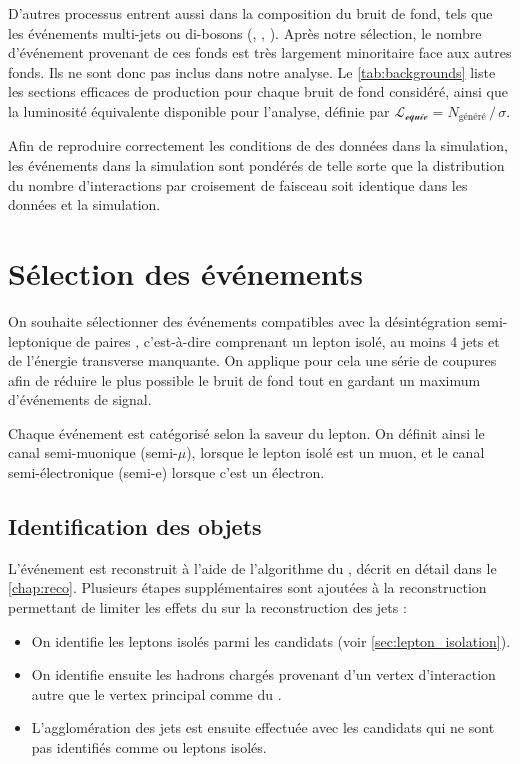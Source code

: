 D'autres processus entrent aussi dans la composition du bruit de fond, tels que les événements multi-jets ou di-bosons (\PW{}\PW, \PZ{}\PZ, \PW{}\PZ). Après notre sélection, le nombre d'événement provenant de ces fonds est très largement minoritaire face aux autres fonds. Ils ne sont donc pas inclus dans notre analyse. Le \cref{tab:backgrounds} liste les sections efficaces de production pour chaque bruit de fond considéré, ainsi que la luminosité équivalente disponible pour l'analyse, définie par $\mathcal{L_\text{equiv}} = N_\text{généré} \, / \, \sigma$.

Afin de reproduire correctement les conditions de \pu des données dans la simulation, les événements dans la simulation sont pondérés de telle sorte que la distribution du nombre d'interactions par croisement de faisceau soit identique dans les données et la simulation.

\section{Sélection des événements}

On souhaite sélectionner des événements compatibles avec la désintégration semi-leptonique de paires \ttbar, c'est-à-dire comprenant un lepton isolé, au moins 4 jets et de l'énergie transverse manquante. On applique pour cela une série de coupures afin de réduire le plus possible le bruit de fond tout en gardant un maximum d'événements de signal.

\medskip

Chaque événement est catégorisé selon la saveur du lepton. On définit ainsi le canal semi-muonique (semi-$\mu$), lorsque le lepton isolé est un muon, et le canal semi-électronique (semi-e) lorsque c'est un électron.

\subsection{Identification des objets}

L'événement est reconstruit à l'aide de l'algorithme du \pf, décrit en détail dans le \cref{chap:reco}. Plusieurs étapes supplémentaires sont ajoutées à la reconstruction permettant de limiter les effets du \pu sur la reconstruction des jets :
\begin{itemize}
    \item On identifie les leptons isolés parmi les candidats \pf (voir \cref{sec:lepton_isolation}).
    \item On identifie ensuite les hadrons chargés provenant d'un vertex d'interaction autre que le vertex principal comme du \pu.
    \item L'agglomération des jets est ensuite effectuée avec les candidats \pf qui ne sont pas identifiés comme \pu ou leptons isolés.
\end{itemize}


